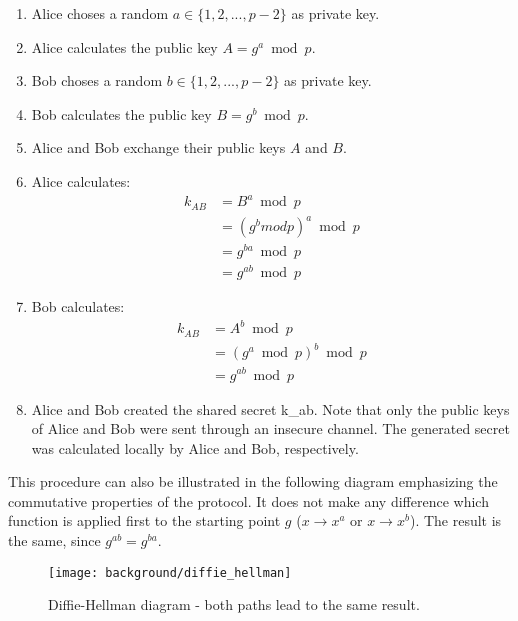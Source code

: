 \begin{enumerate}
	\item Alice choses a random $a \in \{1, 2, ... , p-2\}$ as private key. 
	\item Alice calculates the public key $A = g^a\bmod p$.
	\item Bob choses a random $b \in \{1, 2, ... , p-2\}$ as private key. 
	\item Bob calculates the public key $B = g^b\bmod p$.
	\item Alice and Bob exchange their public keys $A$ and $B$.
	\item Alice calculates: 
	      \begin{equation}
	      	\begin{split}
	      		k_{AB} & = B^a\bmod p \\
	      		& = (g^b mod p)^a\bmod p \\
	      		& = g^{b a}\bmod p \\
	      		& = g^{a b}\bmod p
	      	\end{split}
	      \end{equation}
	\item Bob calculates: 
	      \begin{equation}
	      	\begin{split}
	      		k_{AB} & = A^b\bmod p \\
	      		& = (g^a\bmod p)^b\bmod p \\
	      		& = g^{a b}\bmod p
	      	\end{split}
	      \end{equation}
	\item Alice and Bob created the shared secret \gls{k_ab}. Note that only the public keys of Alice and Bob were sent through an insecure channel. The generated secret was calculated locally by Alice and Bob, respectively.
\end{enumerate}

This procedure can also be illustrated in the following diagram emphasizing the commutative properties of the protocol. It does not make any difference which function is applied first to the starting point $g$ ($x \to x^a$ or $x \to x^b$). The result is the same, since $g^{ab} = g^{ba}$.

\begin{figure}[htpb]
  \centering
  \texttt{[image: background/diffie\_hellman]}
  \caption[Diffie-Hellman diagram]{Diffie-Hellman diagram - both paths lead to the same result.}
  \label{fig:diffie_hellman}
\end{figure}

